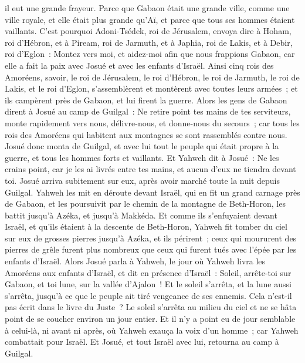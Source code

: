 \begin{multicols}{2}
il eut une grande frayeur. Parce que Gabaon était une grande ville, comme une ville royale, et elle était plus grande qu'Aï, et parce que tous ses hommes étaient vaillants.
C'est pourquoi Adoni-Tsédek, roi de Jérusalem, envoya dire à Hoham, roi d'Hébron, et à Piream, roi de Jarmuth, et à Japhia, roi de Lakis, et à Debir, roi d'Eglon~:
Montez vers moi, et aidez-moi afin que nous frappions Gabaon, car elle a fait la paix avec Josué et avec les enfants d'Israël.
Ainsi cinq rois des Amoréens, savoir, le roi de Jérusalem, le roi d'Hébron, le roi de Jarmuth, le roi de Lakis, et le roi d'Eglon, s'assemblèrent et montèrent avec toutes leurs armées~; et ils campèrent près de Gabaon, et lui firent la guerre.
Alors les gens de Gabaon dirent à Josué au camp de Guilgal~: Ne retire point tes mains de tes serviteurs, monte rapidement vers nous, délivre-nous, et donne-nous du secours~; car tous les rois des Amoréens qui habitent aux montagnes se sont rassemblés contre nous.
Josué donc monta de Guilgal, et avec lui tout le peuple qui était propre à la guerre, et tous les hommes forts et vaillants.
Et Yahweh dit à Josué~: Ne les crains point, car je les ai livrés entre tes mains, et aucun d'eux ne tiendra devant toi.
Josué arriva subitement sur eux, après avoir marché toute la nuit depuis Guilgal.
Yahweh les mit en déroute devant Israël, qui en fit un grand carnage près de Gabaon, et les poursuivit par le chemin de la montagne de Beth-Horon, les battit jusqu'à Azéka, et jusqu'à Makkéda.
Et comme ils s'enfuyaient devant Israël, et qu'ils étaient à la descente de Beth-Horon, Yahweh fit tomber du ciel sur eux de grosses pierres jusqu'à Azéka, et ils périrent~; ceux qui moururent des pierres de grêle furent plus nombreux que ceux qui furent tués avec l'épée par les enfants d'Israël.
Alors Josué parla à Yahweh, le jour où Yahweh livra les Amoréens aux enfants d'Israël, et dit en présence d'Israël~: Soleil, arrête-toi sur Gabaon, et toi lune, sur la vallée d'Ajalon~!
Et le soleil s'arrêta, et la lune aussi s'arrêta, jusqu'à ce que le peuple ait tiré vengeance de ses ennemis. Cela n'est-il pas écrit dans le livre du Juste~? Le soleil s'arrêta au milieu du ciel et ne se hâta point de se coucher environ un jour entier.
Et il n'y a point eu de jour semblable à celui-là, ni avant ni après, où Yahweh exauça la voix d'un homme~; car Yahweh combattait pour Israël.
Et Josué, et tout Israël avec lui, retourna au camp à Guilgal.

\end{multicols}
